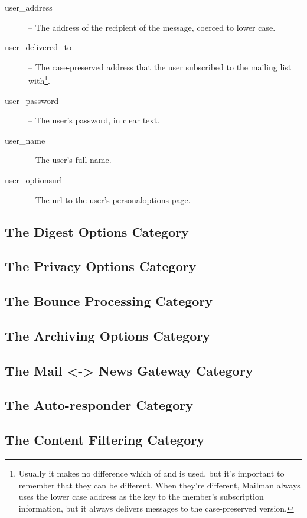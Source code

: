 \documentclass{howto}
\begin{document}
\begin{description}
\item[user_address] --
    The address of the recipient of the message, coerced to lower case.

\item[user_delivered_to] --
    The case-preserved address that the user subscribed to the mailing
    list with\footnote{Usually it makes no difference which of
     and  is used, but it's
    important to remember that they can be different.  When they're
    different, Mailman always uses the lower case address as the key
    to the member's subscription information, but it always delivers
    messages to the case-preserved version.}.

\item[user_password] --
    The user's password, in clear text.

\item[user_name] --
    The user's full name.

\item[user_optionsurl] --
    The url to the user's personaloptions page.
\end{description}

\subsection{The Digest Options Category}
\subsection{The Privacy Options Category}
\subsection{The Bounce Processing Category}
\subsection{The Archiving Options Category}
\subsection{The Mail <-> News Gateway Category}
\subsection{The Auto-responder Category}
\subsection{The Content Filtering Category}
\end{document}
